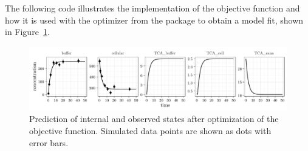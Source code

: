 \documentclass[article]{jss}
\begin{document}
The following code illustrates the implementation of the objective function and how it is used with the  optimizer from the  package \citep{trust} to obtain a model fit, shown in Figure~\ref{fig:myfit}.

\begin{CodeChunk}
\end{CodeChunk}


\begin{figure}[ht]
	\centering
	\includegraphics[width = \textwidth]{images/figure4}
	\caption{Prediction of internal and observed states after optimization of the objective function. Simulated data points are shown as dots with error bars.}
	\label{fig:myfit}
\end{figure}
\end{document}
